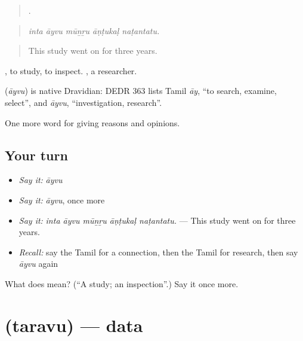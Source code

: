 \begin{quote}
    .
\end{quote}

\begin{quote}
\emph{inta āyvu mūṉṟu āṇṭukaḷ naṭantatu.}
\end{quote}

\begin{quote}
This study went on for three years.
\end{quote}

 , to study, to inspect. , a researcher.

\begin{cousinweb}
\textbf{} (\emph{āyvu}) is native Dravidian: DEDR 363 lists Tamil \emph{āy}, \textquotedblleft{}to search, examine, select\textquotedblright{}, and \emph{āyvu}, \textquotedblleft{}investigation, research\textquotedblright{}.
\end{cousinweb}

\begin{grammarlens}[title={What you've built}]
One more word for giving reasons and opinions.
\end{grammarlens}

\subsection*{Your turn}
\begin{itemize}
\raggedright
  \item \emph{Say it:} \emph{āyvu}
  \item \emph{Say it:} \emph{āyvu}, once more
  \item \emph{Say it:} \emph{inta āyvu mūṉṟu āṇṭukaḷ naṭantatu.} — This study went on for three years.
  \item \emph{Recall:} say the Tamil for a connection, then the Tamil for research, then say \emph{āyvu} again
\end{itemize}

\begin{tcolorbox}[breakable,colback=teal!4,colframe=teal!35!black,title={Before you move on}]
What does  mean? (\textquotedblleft{}A study; an inspection\textquotedblright{}.) Say it once more.
\end{tcolorbox}
\section[\texorpdfstring{\ta{தரவு} (taravu)}{தரவு (taravu)}]{ (taravu) — data}

